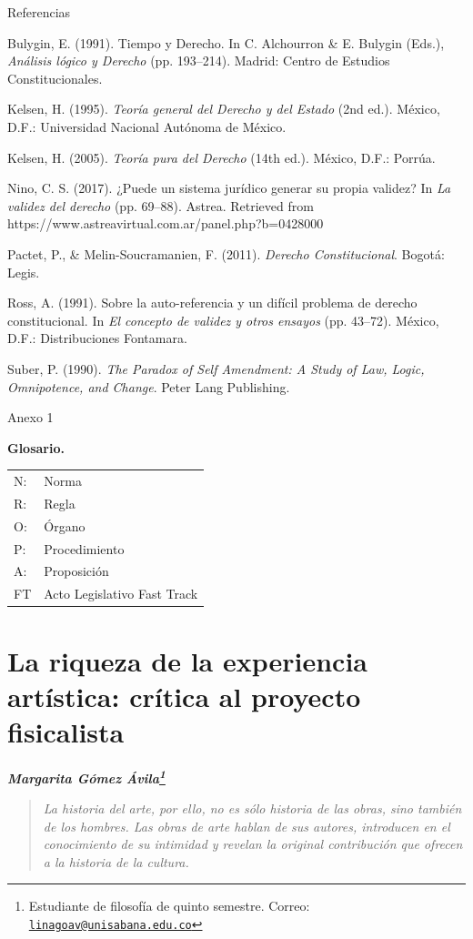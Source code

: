 \documentclass[]{book}
\newcommand{\autor}[1]{            %
  \begin{center}                   %
    \vspace*{-3.5em}               %
    \textbf{\textit{\large #1}}    %
    \vspace*{+4em}                 %
  \end{center}
}
\begin{document}
Referencias

Bulygin, E. (1991). Tiempo y Derecho. In C. Alchourron \& E. Bulygin
(Eds.), \emph{Análisis lógico y Derecho} (pp. 193--214). Madrid: Centro
de Estudios Constitucionales.

Kelsen, H. (1995). \emph{Teoría general del Derecho y del Estado} (2nd
ed.). México, D.F.: Universidad Nacional Autónoma de México.

Kelsen, H. (2005). \emph{Teoría pura del Derecho} (14th ed.). México,
D.F.: Porrúa.

Nino, C. S. (2017). ¿Puede un sistema jurídico generar su propia
validez? In \emph{La validez del derecho} (pp. 69--88). Astrea.
Retrieved from https://www.astreavirtual.com.ar/panel.php?b=0428000

Pactet, P., \& Melin-Soucramanien, F. (2011). \emph{Derecho
Constitucional}. Bogotá: Legis.

Ross, A. (1991). Sobre la auto-referencia y un difícil problema de
derecho constitucional. In \emph{El concepto de validez y otros ensayos}
(pp. 43--72). México, D.F.: Distribuciones Fontamara.

Suber, P. (1990). \emph{The Paradox of Self Amendment: A Study of Law,
Logic, Omnipotence, and Change}. Peter Lang Publishing.

Anexo 1

\textbf{Glosario.}

\begin{longtable}[]{@{}ll@{}}
\toprule
\midrule
\endhead
N: & Norma\tabularnewline
R: & Regla\tabularnewline
O: & Órgano\tabularnewline
P: & Procedimiento\tabularnewline
A: & Proposición\tabularnewline
FT & Acto Legislativo Fast Track\tabularnewline
\bottomrule
\end{longtable}

\chapter{\texorpdfstring{\textbf{La riqueza de la experiencia artística:
crítica al proyecto
fisicalista}}{La riqueza de la experiencia artística: crítica al proyecto fisicalista}}\label{la-riqueza-de-la-experiencia-artuxedstica-cruxedtica-al-proyecto-fisicalista}

\autor{Margarita Gómez Ávila\footnote{Estudiante de filosofía de
  quinto semestre. Correo:
  \href{mailto:linagoav@unisabana.edu.co}{\nolinkurl{linagoav@unisabana.edu.co}}}}

\begin{quote}
\emph{La historia del arte, por ello, no es sólo historia de las obras,
sino también de los hombres. Las obras de arte hablan de sus autores,
introducen en el conocimiento de su intimidad y revelan la original
contribución que ofrecen a la historia de la cultura.}
\end{quote}
\end{document}
